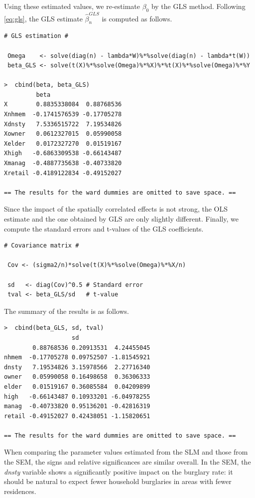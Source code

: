 \documentclass[10.5pt, A4paper, openany, uplatex]{book}
\renewcommand{\hat}{\widehat}
\numberwithin{equation}{section}
\begin{document}
Using these estimated values, we re-estimate $\beta_0$ by the GLS method.
Following \eqref{eq:gls}, the GLS estimate $\hat \beta_n^{GLS}$ is computed as follows.
\begin{lstlisting}[basicstyle=\ttfamily\footnotesize, frame=single]
# GLS estimation #

 Omega    <- solve(diag(n) - lambda*W)%*%solve(diag(n) - lambda*t(W))
 beta_GLS <- solve(t(X)%*%solve(Omega)%*%X)%*%t(X)%*%solve(Omega)%*%Y

>  cbind(beta, beta_GLS)
         beta            
X        0.8835338084  0.88768536
Xnhmem  -0.1741576539 -0.17705278
Xdnsty   7.5336515722  7.19534826
Xowner   0.0612327015  0.05990058
Xelder   0.0172327270  0.01519167
Xhigh   -0.6863309538 -0.66143487
Xmanag  -0.4887735638 -0.40733820
Xretail -0.4189122834 -0.49152027

== The results for the ward dummies are omitted to save space. ==
\end{lstlisting}
Since the impact of the spatially correlated effects is not strong, the OLS estimate and the one obtained by GLS are only slightly different.
Finally, we compute the standard errors and t-values of the GLS coefficients.
\begin{lstlisting}[basicstyle=\ttfamily\footnotesize, frame=single]
# Covariance matrix #

 Cov <- (sigma2/n)*solve(t(X)%*%solve(Omega)%*%X/n)

 sd   <- diag(Cov)^0.5 # Standard error
 tval <- beta_GLS/sd   # t-value
\end{lstlisting}
The summary of the results is as follows. 
\begin{lstlisting}[basicstyle=\ttfamily\footnotesize, frame=single]
>  cbind(beta_GLS, sd, tval)
                   sd
        0.88768536 0.20913531  4.24455045
nhmem  -0.17705278 0.09752507 -1.81545921
dnsty   7.19534826 3.15978566  2.27716340
owner   0.05990058 0.16498658  0.36306333
elder   0.01519167 0.36085584  0.04209899
high   -0.66143487 0.10933201 -6.04978255
manag  -0.40733820 0.95136201 -0.42816319
retail -0.49152027 0.42438051 -1.15820651

== The results for the ward dummies are omitted to save space. ==
\end{lstlisting}
When comparing the parameter values estimated from the SLM and those from the SEM, the signs and relative significances are similar overall.
In the SEM, the \textit{dnsty} variable shows a significantly positive impact on the burglary rate: it should be natural to expect fewer household burglaries in areas with fewer residences.
\end{document}
